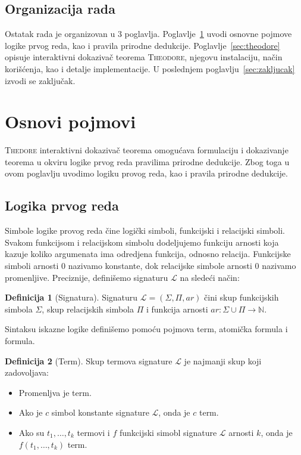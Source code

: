 \documentclass[a4paper,10pt]{article}
\theoremstyle{definition}
\newtheorem{definition}{Definicija}[section]
\begin{document}
\subsection{Organizacija rada}
\label{sub:organizacija}

Ostatak rada je organizovan u 3 poglavlja. Poglavlje~\ref{sec:osnove} uvodi osnovne pojmove logike prvog reda, kao i pravila prirodne dedukcije. Poglavlje~\ref{sec:theodore} opisuje interaktivni dokazivač teorema \textsc{Theodore}, njegovu instalaciju, način korišćenja, kao i detalje implementacije. U poslednjem poglavlju~\ref{sec:zakljucak} izvodi se zaključak.

\section{Osnovi pojmovi}
\label{sec:osnove}

\textsc{Thedore} interaktivni dokazivač teorema omogućava formulaciju i dokazivanje teorema u okviru logike prvog reda pravilima prirodne dedukcije. Zbog toga u ovom poglavlju uvodimo logiku provog reda, kao i pravila prirodne dedukcije.

\subsection{Logika prvog reda}
\label{sub:fol}

Simbole logike provog reda čine logički simboli, funkcijski i relacijski simboli. Svakom funkcijsom i relacijskom simbolu dodeljujemo funkciju arnosti koja kazuje koliko argumenata ima odredjena funkcija, odnosno relacija. Funkcijske simboli arnosti $0$ nazivamo konstante, dok relacijske simbole arnosti $0$ nazivamo promenljive. Preciznije, definišemo signaturu $\mathcal{L}$ na sledeći način:

\begin{definition}[Signatura]
    Signaturu $\mathcal{L} = (\Sigma, \Pi, ar)$ čini skup funkcijskih simbola $\Sigma$, skup relacijskih simbola $\Pi$ i funkcija arnosti $ar : \Sigma \cup \Pi \to \mathbb{N}$.
\end{definition}

Sintaksu iskazne logike definišemo pomoću pojmova term, atomička formula i formula.

\begin{definition}[Term]
    Skup termova signature $\mathcal{L}$ je najmanji skup koji zadovoljava:
    \begin{itemize}
        \item{Promenljva je term.}
        \item{Ako je $c$ simbol konstante signature $\mathcal{L}$, onda je $c$ term.}
        \item{Ako su $t_1, \ldots, t_k$ termovi i $f$ funkcijski simobl signature $\mathcal{L}$ arnosti $k$, onda je $f(t_1, \ldots, t_k)$ term.}
    \end{itemize}
\end{definition}
\end{document}
